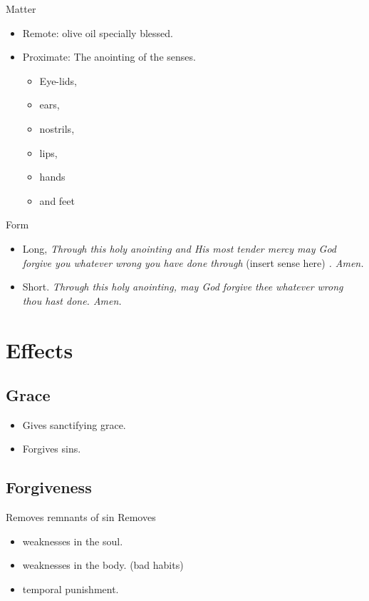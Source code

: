 \documentclass{beamer}
\begin{document}
\begin{frame}{Matter}
\begin{itemize}
\item Remote:  olive oil specially blessed.
\item Proximate: The anointing of the senses.
\begin{itemize}
\item Eye-lids,
\item ears, 
\item nostrils,
\item  lips,
\item  hands 
\item and  feet 
\end{itemize}
\end{itemize}
\end{frame}

\begin{frame}{Form}
\begin{itemize}
\item Long,
\emph{Through this  holy  anointing  and
His most tender mercy may God forgive  you  whatever  wrong  you  have  done
through} (insert sense here) \emph{. Amen.}
\item Short.
\emph{Through this  holy
anointing, may God forgive thee whatever wrong thou hast done. Amen.}
\end{itemize}
\end{frame}

\section{Effects}

\subsection{Grace}

\begin{frame}
\begin{itemize}
\item  Gives sanctifying grace.
\item  Forgives sins.
\end{itemize}
\end{frame}

\subsection{Forgiveness}

\begin{frame}{Removes remnants of sin}
Removes
\begin{itemize}
\item weaknesses in the soul.
\item weaknesses in the body. (bad habits)
\item temporal punishment.
\end{itemize}
\end{frame}
\end{document}

